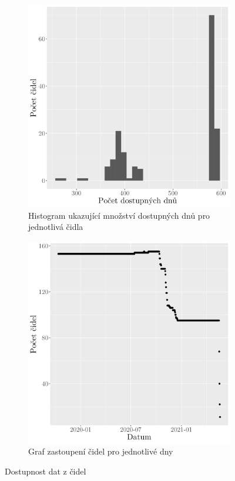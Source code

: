 \begin{figure}
	\centering
	\begin{subfigure}{0.45\textwidth}
  \includegraphics[width=\textwidth]{img/hist_numofdayavailability.png}
	\caption{Histogram ukazující množství dostupných dnů pro jednotlivá čidla}
	\label{fig:dostupnostdat}
	\end{subfigure}
	\hfill
	\begin{subfigure}{0.45\textwidth}
  \includegraphics[width=\textwidth]{img/date_availability.png}
	\caption{Graf zastoupení čidel pro jednotlivé dny}
	\label{fig:dostupnostdnu}
	\end{subfigure}
	\caption{Dostupnost dat z čidel}
\end{figure}

